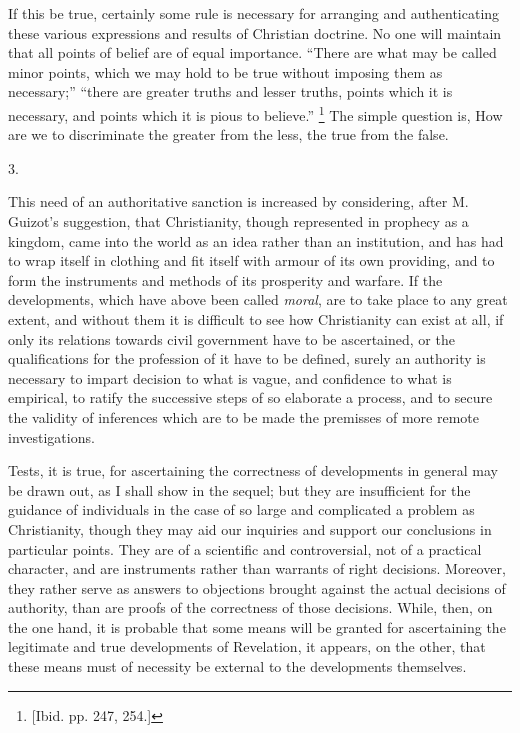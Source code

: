 If this be true, certainly some rule is necessary for
arranging and authenticating these various expressions
and results of Christian doctrine. No one will maintain
that all points of belief are of equal importance.
``There are what may be called minor points, which we
may hold to be true without imposing them as
necessary;'' ``there are greater truths and
lesser truths, points which it is necessary, and points
which it is pious to believe.'' \footnote{[Ibid. pp. 247, 254.]} The simple question is, How
are we to discriminate the greater from the less, the
true from the false.

3.

This need of an authoritative sanction is increased by
considering, after M. Guizot's suggestion, that
Christianity, though represented in prophecy as a
kingdom, came into the world as an idea rather than an
institution, and has had to wrap itself in clothing and
fit itself with armour of its own providing, and to form
the instruments and methods of its prosperity and
warfare. If the developments, which have above been
called \emph{moral}, are to take place to any great
extent, and without them it is difficult to see how
Christianity can exist at all, if only its relations
towards civil government have to be ascertained, or the
qualifications for the profession of it have to be
defined, surely an authority is necessary to impart
decision to what is vague, and confidence to what is
empirical, to ratify the successive steps of so elaborate
a process, and to secure the validity of inferences which
are to be made the premisses of more remote
investigations.

Tests, it is true, for ascertaining the correctness of
developments in general may be drawn out, as I shall show
in the sequel; but they are insufficient for the guidance
of individuals in the case of so large and complicated a
problem as Christianity, though they may aid our
inquiries and support our conclusions in particular
points. They are of a scientific and controversial, not
of a practical character, and are instruments rather than
warrants of right decisions. Moreover, they rather serve
as answers to objections brought against the actual
decisions of authority, than are proofs of the
correctness of those decisions. While, then, on the one
hand, it is probable that some means will be granted for
ascertaining the legitimate and true developments of
Revelation, it appears, on the other, that these means
must of necessity be external to the developments
themselves.


